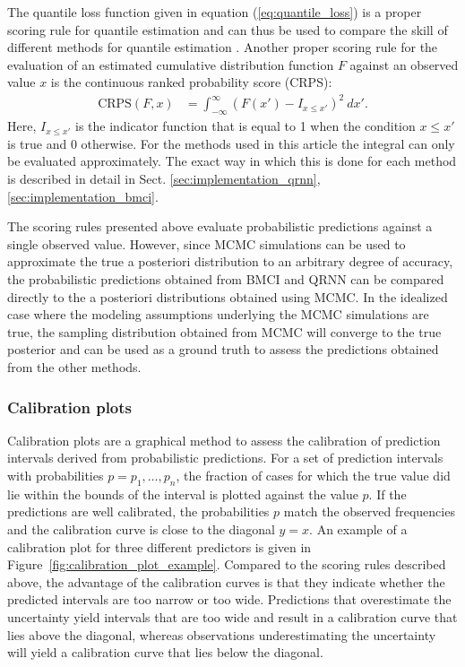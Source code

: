 \documentclass[journal abbreviation, manuscript]{copernicus}
\begin{document}
The quantile loss function given in equation (\ref{eq:quantile_loss}) is a
proper scoring rule for quantile estimation and can thus be used to compare the
skill of different methods for quantile estimation \citep{gneiting}. Another
proper scoring rule for the evaluation of an estimated cumulative distribution
function $F$ against an observed value $x$ is the continuous ranked probability
score (CRPS):
  \begin{align}\label{eq:crps}
    \text{CRPS}(F, x) &= \int_{-\infty}^{\infty} \left ( F(x') - I_{x \leq x'}
    \right )^2 \: dx'.
  \end{align}
  Here, $I_{x \leq x'}$ is the indicator function that is equal to 1 when
  the condition $x \leq x'$ is true and $0$ otherwise.
  For the methods used in this article the integral can only be evaluated
  approximately. The exact way in which this is done for each method is
  described in detail in Sect. \ref{sec:implementation_qrnn},
  \ref{sec:implementation_bmci}.

  The scoring rules presented above evaluate probabilistic predictions against a
  single observed value. However, since MCMC simulations can be used to
  approximate the true a posteriori distribution to an arbitrary degree of
  accuracy, the probabilistic predictions obtained from BMCI and QRNN can be
  compared directly to the a posteriori distributions obtained using MCMC. In
  the idealized case where the modeling assumptions underlying the MCMC
  simulations are true, the sampling distribution obtained from MCMC will
  converge to the true posterior and can be used as a ground truth to assess the
  predictions obtained from the other methods.
  
\subsubsection{Calibration plots} 

Calibration plots are a graphical method to assess the calibration of prediction
intervals derived from probabilistic predictions. For a set of prediction
intervals with probabilities $p = p_1, \dots, p_n$, the fraction of cases
for which the true value did lie within the bounds of the interval is plotted
against the value $p$. If the predictions are well calibrated, the probabilities
$p$ match the observed frequencies and the calibration curve is close to the
diagonal $y = x$. An example of a calibration plot for three different
predictors is given in Figure~\ref{fig:calibration_plot_example}. Compared to the
scoring rules described above, the advantage of the calibration curves is that
they indicate whether the predicted intervals are too narrow or too wide.
Predictions that overestimate the uncertainty yield intervals that are too wide and
result in a calibration curve that lies above the diagonal, whereas observations
underestimating the uncertainty will yield a calibration curve that lies below
the diagonal.
\end{document}
